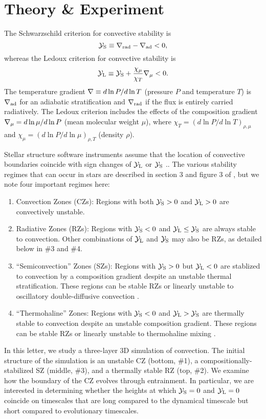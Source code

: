 \section{Theory \& Experiment}
\label{sec:theory}
The Schwarzschild criterion for convective stability is
\begin{equation}
    \yS \equiv \gradrad - \gradad < 0,
    \label{eqn:yS}
\end{equation}
whereas the Ledoux criterion for convective stability is
\begin{equation}
    \yL \equiv \yS +  \frac{\chi_\mu}{\chi_T}\gradmu < 0.
    \label{eqn:yL}
\end{equation}
The temperature gradient $\nabla \equiv d \ln P / d \ln T$ (pressure $P$ and temperature $T$) is $\nabla_{\rm{ad}}$ for an adiabatic stratification and $\nabla_{\rm{rad}}$ if the flux is entirely carried radiatively.
The Ledoux criterion includes the effects of the composition gradient $\nabla_{\mu} = d\ln\mu/d\ln P$ (mean molecular weight $\mu$), where $\chi_T = (d\ln P / d\ln T)_{\rho,\mu}$ and $\chi_\mu = (d\ln P / d\ln\mu)_{\rho,T}$ (density $\rho$).

Stellar structure software instruments assume that the location of convective boundaries coincide with sign changes of $\mathcal{Y}_{\rm{L}}$ or $\mathcal{Y}_{\rm{S}}$ \citep[][sec.~2]{mesa4}..
The various stability regimes that can occur in stars are described in section 3 and figure 3 of \citet{salaris_cassisi_2017}, but we note four important regimes here:
\begin{enumerate}
    \item Convection Zones (CZs): Regions with both $\mathcal{Y}_{\rm{S}} > 0$ and $\mathcal{Y}_{\rm{L}} > 0$ are convectively unstable.
    \item Radiative Zones (RZs): Regions with $\mathcal{Y}_{\rm{S}} < 0$ and $\mathcal{Y}_{\rm{L}} \leq \mathcal{Y}_{\rm{S}}$ are always stable to convection.
        Other combinations of $\mathcal{Y}_{\rm{L}}$ and $\mathcal{Y}_{\rm{S}}$ may also be RZs, as detailed below in \#3 and \#4.
    \item ``Semiconvection'' Zones (SZs): Regions with $\mathcal{Y}_{\rm{S}} > 0$ but $\mathcal{Y}_{\rm{L}} < 0$ are stablized to convection by a composition gradient despite an unstable thermal stratification.
        These regions can be stable RZs or linearly unstable to oscillatory double-diffusive convection \citep[ODDC, see][chapters 2 and 4]{garaud_2018}.
    \item ``Thermohaline'' Zones: Regions with $\mathcal{Y}_{\rm{S}} < 0$ and $\mathcal{Y}_{\rm{L}} > \mathcal{Y}_{\rm{S}}$ are thermally stable to convection despite an unstable composition gradient.
        These regions can be stable RZs or linearly unstable to thermohaline mixing \citep[see][chapters 2 and 3]{garaud_2018}.
\end{enumerate}
In this letter, we study a three-layer 3D simulation of convection.
The initial structure of the simulation is an unstable CZ (bottom, \#1), a compositionally-stabilized SZ (middle, \#3), and a thermally stable RZ (top, \#2).
We examine how the boundary of the CZ evolves through entrainment.
In particular, we are interested in determining whether the heights at which $\mathcal{Y}_{\rm{S}} = 0$ and $\mathcal{Y}_{\rm{L}} = 0$ coincide on timescales that are long compared to the dynamical timescale but short compared to evolutionary timescales.

